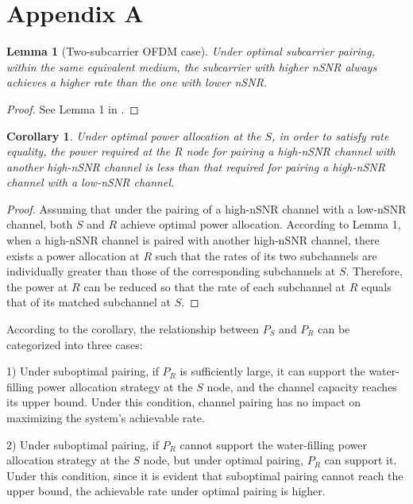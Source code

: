 \documentclass[lettersize,journal]{IEEEtran}
\newtheorem{corollary}{Corollary}
\newtheorem{lemma}{Lemma}  %
\begin{document}
	\section*{Appendix A}
	\begin{lemma}[Two-subcarrier OFDM case]
		Under optimal subcarrier pairing, within the same equivalent medium, the subcarrier with higher nSNR always achieves a higher rate than the one with lower nSNR.
	\end{lemma}
	\begin{proof}
		See Lemma 1 in \cite{5071270}.
	\end{proof}
	\begin{corollary}
		Under optimal power allocation at the \(S\), in order to satisfy rate equality, the power required at the R node for pairing a high-nSNR channel with another high-nSNR channel is less than that required for pairing a high-nSNR channel with a low-nSNR channel.
	\end{corollary}
	\begin{proof}
		Assuming that under the pairing of a high-nSNR channel with a low-nSNR channel, both \( S \) and \( R \) achieve optimal power allocation. According to Lemma 1, when a high-nSNR channel is paired with another high-nSNR channel, there exists a power allocation at \( R \) such that the rates of its two subchannels are individually greater than those of the corresponding subchannels at \( S \). Therefore, the power at \( R \) can be reduced so that the rate of each subchannel at \( R \) equals that of its matched subchannel at \( S \).
	\end{proof}
	According to the corollary, the relationship between \( P_S \) and \( P_R \) can be categorized into three cases:
	
	1) Under suboptimal pairing, if \( P_R \) is sufficiently large, it can support the water-filling power allocation strategy at the \( S \) node, and the channel capacity reaches its upper bound.  Under this condition, channel pairing has no impact on maximizing the system's achievable rate.
	
	
	2) Under suboptimal pairing, if \( P_R \) cannot support the water-filling power allocation strategy at the \( S \) node, but under optimal pairing, \( P_R \) can support it. Under this condition, since it is evident that suboptimal pairing cannot reach the upper bound, the achievable rate under optimal pairing is higher.
	
\end{document}

